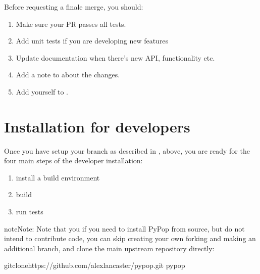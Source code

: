 \documentclass[letterpaper,10pt,english,openany,oneside]{sphinxmanual}
\begin{document}
\sphinxAtStartPar
{}

\sphinxAtStartPar
Before requesting a finale merge, you should:
\begin{enumerate}
%
\item {} 
\sphinxAtStartPar
Make sure your PR passes all  tests.

\item {} 
\sphinxAtStartPar
Add unit tests if you are developing new features

\item {} 
\sphinxAtStartPar
Update documentation when there’s new API, functionality etc.

\item {} 
\sphinxAtStartPar
Add a note to  about the changes.

\item {} 
\sphinxAtStartPar
Add yourself to .

\end{enumerate}


\section{Installation for developers}
\label{\detokenize{docs/guide-chapter-contributing:installation-for-developers}}
\sphinxAtStartPar
Once you have setup your branch as described in {\hyperref[\detokenize{docs/guide-chapter-contributing:making-a-code-contribution}]{}}, above, you are ready for the four main steps of the
developer installation:
\begin{enumerate}
%
\item {} 
\sphinxAtStartPar
install a build environment

\item {} 
\sphinxAtStartPar
build

\item {} 
\sphinxAtStartPar
run tests

\end{enumerate}

\begin{sphinxadmonition}{note}{Note:}
\sphinxAtStartPar
Note that you if you need to install PyPop from source, but do not
intend to contribute code, you can skip creating your own forking
and making an additional branch, and clone the main upstream
repository directly:

\begin{sphinxVerbatim}[commandchars=\\\{\}]
gitclonehttps://github.com/alexlancaster/pypop.git
pypop
\end{sphinxVerbatim}
\end{sphinxadmonition}
\end{document}
